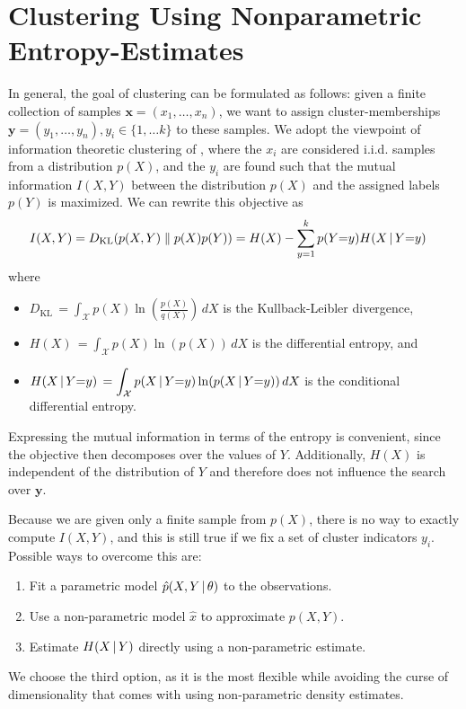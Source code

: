 \section{Clustering Using Nonparametric Entropy-Estimates}
In general, the goal of clustering can be formulated as follows: 
given a finite collection of samples $\mathbf{x} = (x_1, \dotsc, x_n)$, we want to 
assign cluster-memberships $\mathbf{y} = (y_1, \dotsc, y_n ), y_i \in \{1, \dotsc k\}$ to these samples.
%
We adopt the viewpoint of information theoretic clustering of \citet{gokcay2002information}, 
where the $x_i$ are considered i.i.d{.} samples from a distribution $p(X)$, and the 
$y_i$ are found such that the mutual information $I(X, Y)$ between the distribution $p(X)$ and the
assigned labels $p(Y)$ is maximized.
We can rewrite this objective as 
\begin{align}
         I(X, Y)
        &= D_{\text{KL}}(p(X, Y) \parallel p(X) p(Y)) = H(X) - \sum_{y=1}^k p(Y{=}y) H(X \, | \, Y {=} y)
\end{align}
where
\begin{itemize}
\item $\displaystyle D_\text{KL}\, = \int_\mathcal{X} p(X) \ln\left(\frac{p(X)}{q(X)}\right)\,dX$ is the Kullback-Leibler divergence,
\item $\displaystyle H(X)\, = \int_\mathcal{X} p(X) \ln(p(X))\,dX$ is the differential entropy, and
\item $\displaystyle H(X \, | \, Y{=}y)\, = \int_\mathcal{X} p(X \, | \, Y {=}y) \ln(p(X \, | \, Y {=} y))\,dX$ is the conditional differential entropy.
    \end{itemize}
Expressing the mutual information in terms of the entropy is convenient, since
the objective then decomposes over the values of $Y$. 
%
Additionally, $H(X)$ is independent of the distribution of $Y$ and therefore
does not influence the search over $\mathbf{y}$.

Because we are given only a finite sample from $p(X)$, there is no way to
exactly compute $I(X, Y)$, and this is still true if we fix a set of cluster
indicators $y_i$.
%
Possible ways to overcome this are:
\begin{enumerate}
    \item Fit a parametric model $\hat{p}(X, Y \, | \, \theta)$ to the observations.
    \item Use a non-parametric model $\hat{x}$ to approximate $p(X, Y)$. 
    \item Estimate $H(X \, | \, Y)$ directly using a non-parametric estimate.
\end{enumerate}
We choose the third option, as it is the most flexible while avoiding
the curse of dimensionality that comes with using non-parametric density estimates.


